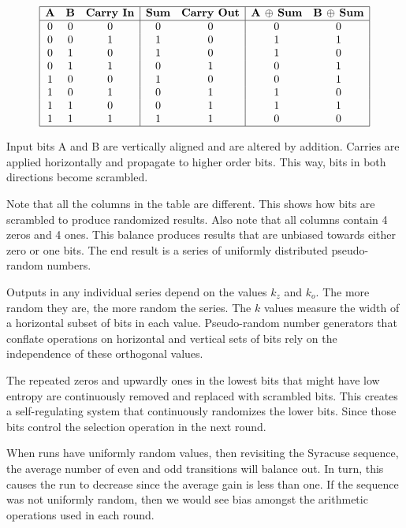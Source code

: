 \documentclass[letterpaper]{article}
\begin{document}
\begin{multicols}{2}
\[
\begin{array}{|c c c|c c|c c|}
\hline
\textbf{A} & \textbf{B} & \textbf{Carry In} & \textbf{Sum} & \textbf{Carry Out} & \textbf{A $\oplus$ Sum} & \textbf{B $\oplus$ Sum} \\ 
\hline
0 & 0 & 0 & 0 & 0 & 0 & 0 \\
0 & 0 & 1 & 1 & 0 & 1 & 1 \\
0 & 1 & 0 & 1 & 0 & 1 & 0 \\
0 & 1 & 1 & 0 & 1 & 0 & 1 \\
1 & 0 & 0 & 1 & 0 & 0 & 1 \\
1 & 0 & 1 & 0 & 1 & 1 & 0 \\
1 & 1 & 0 & 0 & 1 & 1 & 1 \\
1 & 1 & 1 & 1 & 1 & 0 & 0 \\ 
\hline
\end{array}
\]

Input bits A and B are vertically aligned and are altered by addition. Carries are applied horizontally and propagate to higher order bits. This way, bits in both directions become scrambled.

Note that all the columns in the table are different. This shows how bits are scrambled to produce randomized results. Also note that all columns contain 4 zeros and 4 ones. This balance produces results that are unbiased towards either zero or one bits. The end result is a series of uniformly distributed pseudo-random numbers.

Outputs in any individual series depend on the values $k_z$ and $k_o$. The more random they are, the more random the series. The $k$ values measure the width of a horizontal subset of bits in each value. Pseudo-random number generators that conflate operations on horizontal and vertical sets of bits rely on the independence of these orthogonal values.

The repeated zeros and upwardly ones in the lowest bits that might have low entropy are continuously removed and replaced with scrambled bits. This creates a self-regulating system that continuously randomizes the lower bits. Since those bits control the selection operation in the next round.

When runs have uniformly random values, then revisiting the Syracuse sequence, the average number of even and odd transitions will balance out. In turn, this causes the run to decrease since the average gain is less than one. If the sequence was not uniformly random, then we would see bias amongst the arithmetic operations used in each round.


\end{multicols}
\end{document}

